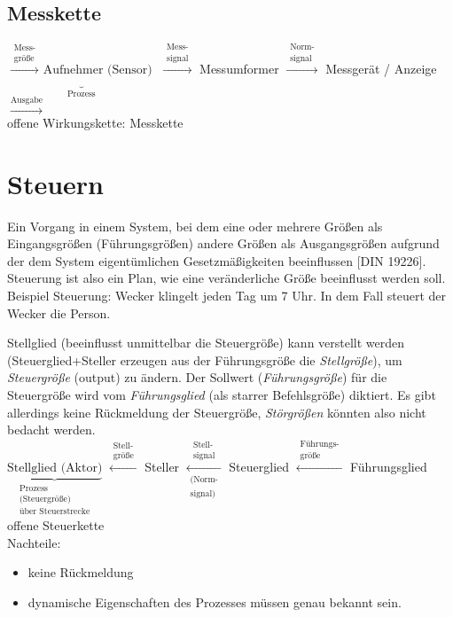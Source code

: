 \subsection{Messkette}
$\underbrace{\overset{\substack{\text{Mess-}\\\text{größe}}}{\longrightarrow} \text{ Aufnehmer (Sensor)}}_{\text{Prozess}}$ 
$\overset{\substack{\text{Mess-}\\\text{signal}}}{\longrightarrow}$ Messumformer 
$\overset{\substack{\text{Norm-}\\\text{signal}}}{\longrightarrow}$ Messgerät / Anzeige 
$\overset{\text{Ausgabe}}{\longrightarrow}$\\
offene Wirkungskette: Messkette

\section{Steuern}
Ein Vorgang in einem System, bei dem eine oder mehrere Größen als Eingangsgrößen (Führungsgrößen) andere Größen als Ausgangsgrößen aufgrund der dem System eigentümlichen Gesetzmäßigkeiten beeinflussen [DIN 19226].\\
Steuerung ist also ein Plan, wie eine veränderliche Größe beeinflusst werden soll.\\
Beispiel Steuerung: Wecker klingelt jeden Tag um 7 Uhr. In dem Fall steuert der Wecker die Person.\medskip

Stellglied (beeinflusst unmittelbar die Steuergröße) kann verstellt werden (Steuerglied+Steller erzeugen aus der Führungsgröße die \emph{Stellgröße}), um \emph{Steuergröße} (output) zu ändern. Der Sollwert (\emph{Führungsgröße}) für die Steuergröße wird vom \emph{Führungsglied} (als starrer Befehlsgröße) diktiert. Es gibt allerdings keine Rückmeldung der Steuergröße, \emph{Störgrößen} könnten also nicht bedacht werden.\\
$\underbrace{\text{Stellglied (Aktor)}}_{\substack{\text{Prozess}\\\text{(Steuergröße)}\\\text{über Steuerstrecke}}}$
$\overset{\substack{\text{Stell-}\\\text{größe}}}{\longleftarrow}$ Steller
$\underset{\substack{\text{(Norm-}\\\text{signal)}}}{\overset{\substack{\text{Stell-}\\\text{signal}}}{\longleftarrow}}$ Steuerglied 
$\overset{\substack{\text{Führungs-}\\\text{größe}}}{\longleftarrow}$ Führungsglied\\
offene Steuerkette\\
Nachteile:
\begin{itemize}
\item keine Rückmeldung
\item dynamische Eigenschaften des Prozesses müssen genau bekannt sein.
\end{itemize}


